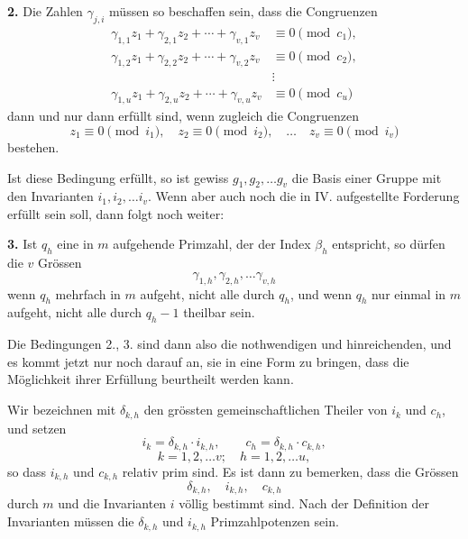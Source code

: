 \documentclass[12pt,a4paper]{article}
\theoremstyle{plain}
\theoremstyle{definition}
\theoremstyle{remark}
\begin{document}
\medskip\noindent\textbf{2.} Die Zahlen $\gamma_{j,i}$ müssen so beschaffen sein, dass die Congruenzen
\begin{equation}\tag{9}
\begin{aligned}
\gamma_{1,1} z_1 + \gamma_{2,1} z_2 + \cdots + \gamma_{v,1} z_v &\equiv 0 \pmod{c_1}, \\
\gamma_{1,2} z_1 + \gamma_{2,2} z_2 + \cdots + \gamma_{v,2} z_v &\equiv 0 \pmod{c_2}, \\
&\vdots \\
\gamma_{1,u} z_1 + \gamma_{2,u} z_2 + \cdots + \gamma_{v,u} z_v &\equiv 0 \pmod{c_u}
\end{aligned}
\end{equation}
dann und nur dann erfüllt sind, wenn zugleich die Congruenzen
\begin{equation}\tag{10}
z_1 \equiv 0 \pmod{i_1}, \quad z_2 \equiv 0 \pmod{i_2}, \quad \ldots \quad z_v \equiv 0 \pmod{i_v}
\end{equation}
bestehen.

\medskip
Ist diese Bedingung erfüllt, so ist gewiss $g_1, g_2, \ldots g_v$ die Basis einer Gruppe mit den Invarianten $i_1, i_2, \ldots i_v$. Wenn aber auch noch die in IV. aufgestellte Forderung erfüllt sein soll, dann folgt noch weiter:

\medskip\noindent\textbf{3.} Ist $q_h$ eine in $m$ aufgehende Primzahl, der der Index $\beta_h$ entspricht, so dürfen die $v$ Grössen
\[
\gamma_{1,h}, \gamma_{2,h}, \ldots \gamma_{v,h}
\]
wenn $q_h$ mehrfach in $m$ aufgeht, nicht alle durch $q_h$, und wenn $q_h$ nur einmal in $m$ aufgeht, nicht alle durch $q_h-1$ theilbar sein.

\medskip
Die Bedingungen 2., 3. sind dann also die nothwendigen und hinreichenden, und es kommt jetzt nur noch darauf an, sie in eine Form zu bringen, dass die Möglichkeit ihrer Erfüllung beurtheilt werden kann.

Wir bezeichnen mit $\delta_{k,h}$ den grössten gemeinschaftlichen Theiler von $i_k$ und $c_h$, und setzen
\[
i_k = \delta_{k,h} \cdot i_{k,h}, \qquad c_h = \delta_{k,h} \cdot c_{k,h},
\]
\[
k = 1, 2, \ldots v; \quad h = 1, 2, \ldots u,
\]
so dass $i_{k,h}$ und $c_{k,h}$ relativ prim sind. Es ist dann zu bemerken, dass die Grössen
\begin{equation}\tag{11}
\delta_{k,h}, \quad i_{k,h}, \quad c_{k,h}
\end{equation}
durch $m$ und die Invarianten $i$ völlig bestimmt sind. Nach der Definition der Invarianten müssen die $\delta_{k,h}$ und $i_{k,h}$ Primzahlpotenzen sein.
\end{document}
